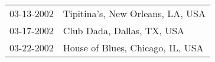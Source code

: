 \begin{supertabular}{ll}
 03-13-2002 &  Tipitina's, New Orleans, LA, USA \\
 03-17-2002 &        Club Dada, Dallas, TX, USA \\
 03-22-2002 &  House of Blues, Chicago, IL, USA \\
\end{supertabular}
